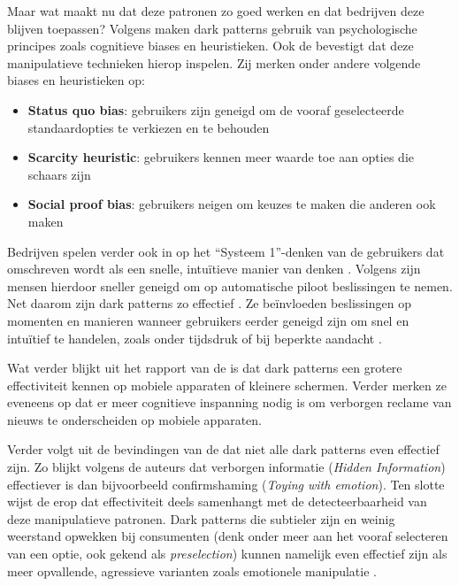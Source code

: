 \newpage

Maar wat maakt nu dat deze patronen zo goed werken en dat bedrijven deze blijven toepassen? Volgens \textcite{Kitkowska2023} maken dark patterns gebruik van psychologische principes zoals cognitieve biases en heuristieken. Ook de \textcite{OECD2022} bevestigt dat deze manipulatieve technieken hierop inspelen. Zij merken onder andere volgende biases en heuristieken op:
\begin{itemize}
    \item \textbf{Status quo bias}: gebruikers zijn geneigd om de vooraf geselecteerde standaardopties te verkiezen en te behouden
    \item \textbf{Scarcity heuristic}: gebruikers kennen meer waarde toe aan opties die schaars zijn
    \item \textbf{Social proof bias}: gebruikers neigen om keuzes te maken die anderen ook maken
\end{itemize}
Bedrijven spelen verder ook in op het “Systeem 1”-denken van de gebruikers dat omschreven wordt als een snelle, intuïtieve manier van denken \autocite{Kitkowska2023}. Volgens \textcite{Kitkowska2023} zijn mensen hierdoor sneller geneigd om op automatische piloot beslissingen te nemen. Net daarom zijn dark patterns zo effectief \autocite{Kitkowska2023}. Ze beïnvloeden beslissingen op momenten en manieren wanneer gebruikers eerder geneigd zijn om snel en intuïtief te handelen, zoals onder tijdsdruk of bij beperkte aandacht \autocite{Kitkowska2023}.

\vspace{1em}

Wat verder blijkt uit het rapport van de \textcite{OECD2022} is dat dark patterns een grotere effectiviteit kennen op mobiele apparaten of kleinere schermen. Verder merken ze eveneens op dat er meer cognitieve inspanning nodig is om verborgen reclame van nieuws te onderscheiden op mobiele apparaten.

\vspace{1em}

Verder volgt uit de bevindingen van de \textcite{OECD2022} dat niet alle dark patterns even effectief zijn. Zo blijkt volgens de auteurs dat verborgen informatie (\textit{Hidden Information}) effectiever is dan bijvoorbeeld confirmshaming (\textit{Toying with emotion}). Ten slotte wijst de \textcite{OECD2022} erop dat effectiviteit deels samenhangt met de detecteerbaarheid van deze manipulatieve patronen. Dark patterns die subtieler zijn en weinig weerstand opwekken bij consumenten (denk onder meer aan het vooraf selecteren van een optie, ook gekend als \textit{preselection}) kunnen namelijk even effectief zijn als meer opvallende, agressieve varianten zoals emotionele manipulatie \autocite{OECD2022}.

